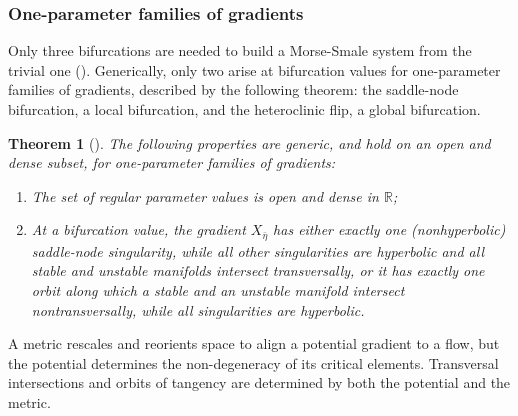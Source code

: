 \documentclass[12pt]{article}
\newtheorem{theorem}{Theorem}
\begin{document}

\subsubsection{One-parameter families of gradients}
\label{subsubsection:one-parameter-families-gradients}

\noindent
Only three bifurcations are needed to build a Morse-Smale system from the trivial one (\cite{smale1960morse,rand2021geometry}). Generically, only two arise at bifurcation values for one-parameter families of gradients, described by the following theorem: the saddle-node bifurcation, a local bifurcation, and the heteroclinic flip, a global bifurcation.
\begin{theorem}[\cite{palis1983stability}]
    The following properties are generic, and hold on an open and dense subset, for one-parameter families of gradients:
    \begin{enumerate}[itemsep=0pt]
        \item The set of regular parameter values is open and dense in $\mathbb{R}$;
        \item At a bifurcation value, the gradient $X_{\bar{\eta}}$ has either exactly one (nonhyperbolic) saddle-node singularity, while all other singularities are hyperbolic and all stable and unstable manifolds intersect transversally, or it has exactly one orbit along which a stable and an unstable manifold intersect nontransversally, while all singularities are hyperbolic.
    \end{enumerate}
\end{theorem}
\noindent
A metric rescales and reorients space to align a potential gradient to a flow, but the potential determines the non-degeneracy of its critical elements. Transversal intersections and orbits of tangency are determined by both the potential and the metric. 
\end{document}
